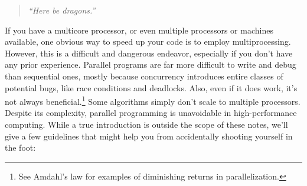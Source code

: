 \label{chap:Parallel computing}

\begin{quote}\small
  \emph{``Here be dragons.''}
\end{quote}

If you have a multicore processor, or even multiple processors or machines available, one obvious way to speed up your code is to employ multiprocessing.
However, this is a difficult and dangerous endeavor, especially if you don't have any prior experience.
Parallel programs are far more difficult to write and debug than sequential ones, mostly because concurrency introduces entire classes of potential bugs, like race conditions and deadlocks.
Also, even if it does work, it's not always beneficial.\footnote{See Amdahl's law for examples of diminishing returns in parallelization.}
Some algorithms simply don't scale to multiple processors.
Despite its complexity, parallel programming is unavoidable in high-performance computing.
While a true introduction is outside the scope of these notes, we'll give a few guidelines that might help you from accidentally shooting yourself in the foot:
